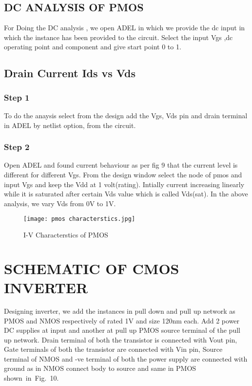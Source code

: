 \documentclass[conference]{IEEEtran}
\begin{document}
\subsection{DC ANALYSIS OF PMOS}
For Doing the DC analysis , we open ADEL in which we provide the dc input in which the instance has been provided to the circuit. Select the input Vgs ,dc operating point and component and give start point 0 to 1.

\subsection{Drain Current Ids vs Vds}
\subsubsection{Step 1}
To do the anaysis select from the design add the Vgs, Vds pin and drain terminal in ADEL by netlist option, from the circuit.
\subsubsection{Step 2}
Open ADEL and found current behaviour as per fig 9 that the current level is different for different Vgs. From the design window select the node of pmos and input Vgs and keep the Vdd at 1 volt(rating). Intially current increasing linearly while it is saturated after certain Vds value which is called Vds(sat). In the above analysis, we vary Vds from 0V to 1V.

\begin{figure}
    \centering
    \texttt{[image: pmos characterstics.jpg]}
    \caption{I-V Characterstics of PMOS}
    \label{fig:enter-label}
\end{figure}


\section{SCHEMATIC OF CMOS INVERTER}
Designing inverter, we add the instances in pull down and pull up network as PMOS and NMOS respectively of rated 1V and size 120nm each. Add 2 power DC supplies at input and another at pull up PMOS source terminal of the pull up network. Drain terminal of both the transistor is connected with Vout pin, Gate terminals of both the transistor are connected with Vin pin, Source terminal of NMOS and -ve terminal of both the power supply are connected with ground as in NMOS connect body to source and same in PMOS shown in Fig. 10.
\end{document}
